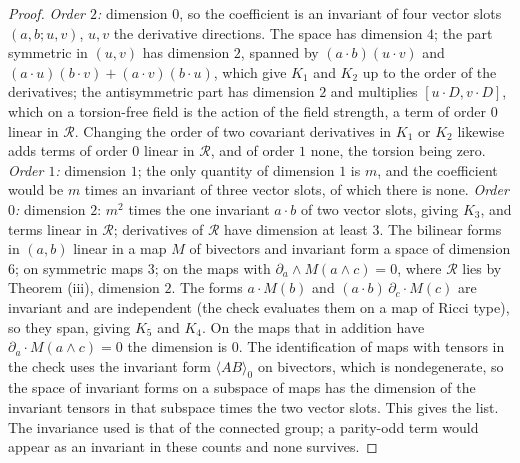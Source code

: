 \begin{proof}
\emph{Order $2$:} dimension $0$, so the coefficient is an invariant of four vector slots $(a, b; u, v)$, $u, v$ the derivative directions. The space has dimension $4$; the part symmetric in $(u, v)$ has dimension $2$, spanned by $(a\cdot b)(u\cdot v)$ and $(a\cdot u)(b\cdot v) + (a\cdot v)(b\cdot u)$, which give $K_{1}$ and $K_{2}$ up to the order of the derivatives; the antisymmetric part has dimension $2$ and multiplies $[u\cdot D, v\cdot D]$, which on a torsion-free field is the action of the field strength, a term of order $0$ linear in $\mathcal{R}$. Changing the order of two covariant derivatives in $K_{1}$ or $K_{2}$ likewise adds terms of order $0$ linear in $\mathcal{R}$, and of order $1$ none, the torsion being zero. \emph{Order $1$:} dimension $1$; the only quantity of dimension $1$ is $m$, and the coefficient would be $m$ times an invariant of three vector slots, of which there is none. \emph{Order $0$:} dimension $2$: $m^{2}$ times the one invariant $a\cdot b$ of two vector slots, giving $K_{3}$, and terms linear in $\mathcal{R}$; derivatives of $\mathcal{R}$ have dimension at least $3$. The bilinear forms in $(a, b)$ linear in a map $M$ of bivectors and invariant form a space of dimension $6$; on symmetric maps $3$; on the maps with $\partial_{a}\wedge M(a\wedge c) = 0$, where $\mathcal{R}$ lies by Theorem (iii), dimension $2$. The forms $a\cdot M(b)$ and $(a\cdot b)\,\partial_{c}\cdot M(c)$ are invariant and are independent (the check evaluates them on a map of Ricci type), so they span, giving $K_{5}$ and $K_{4}$. On the maps that in addition have $\partial_{a}\cdot M(a\wedge c) = 0$ the dimension is $0$. The identification of maps with tensors in the check uses the invariant form $\langle AB\rangle_{0}$ on bivectors, which is nondegenerate, so the space of invariant forms on a subspace of maps has the dimension of the invariant tensors in that subspace times the two vector slots. This gives the list. The invariance used is that of the connected group; a parity-odd term would appear as an invariant in these counts and none survives.


\end{proof}
